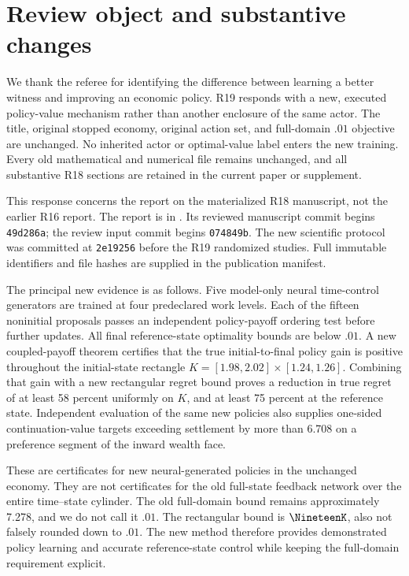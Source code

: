 \section{Review object and substantive changes}
We thank the referee for identifying the difference between learning a better witness and improving an economic policy. R19 responds with a new, executed policy-value mechanism rather than another enclosure of the same actor. The title, original stopped economy, original action set, and full-domain $.01$ objective are unchanged. No inherited actor or optimal-value label enters the new training. Every old mathematical and numerical file remains unchanged, and all substantive R18 sections are retained in the current paper or supplement.

This response concerns the report on the materialized R18 manuscript, not the earlier R16 report. The report is in . Its reviewed manuscript commit begins \texttt{49d286a}; the review input commit begins \texttt{074849b}. The new scientific protocol was committed at \texttt{2e19256} before the R19 randomized studies. Full immutable identifiers and file hashes are supplied in the publication manifest.

The principal new evidence is as follows. Five model-only neural time-control generators are trained at four predeclared work levels. Each of the fifteen noninitial proposals passes an independent policy-payoff ordering test before further updates. All final reference-state optimality bounds are below $.01$. A new coupled-payoff theorem certifies that the true initial-to-final policy gain is positive throughout the initial-state rectangle $K=[1.98,2.02]\times[1.24,1.26]$. Combining that gain with a new rectangular regret bound proves a reduction in true regret of at least 58 percent uniformly on $K$, and at least 75 percent at the reference state. Independent evaluation of the same new policies also supplies one-sided continuation-value targets exceeding settlement by more than 6.708 on a preference segment of the inward wealth face.

These are certificates for new neural-generated policies in the unchanged economy. They are not certificates for the old full-state feedback network over the entire time--state cylinder. The old full-domain bound remains approximately 7.278, and we do not call it $.01$. The rectangular bound is $\NineteenK$, also not falsely rounded down to $.01$. The new method therefore provides demonstrated policy learning and accurate reference-state control while keeping the full-domain requirement explicit.

